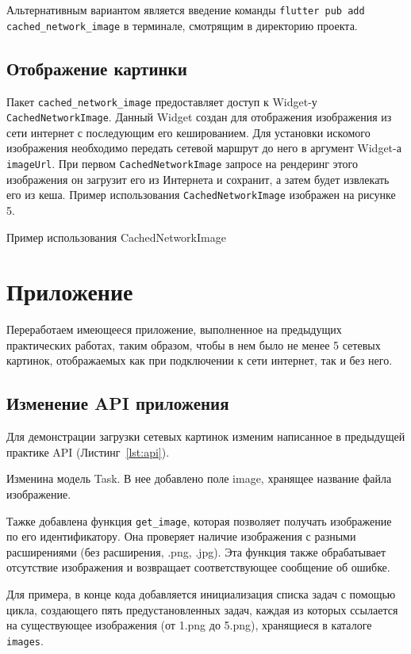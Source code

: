 Альтернативным вариантом является введение команды
\texttt{flutter pub add cached\_network\_image} в терминале,
смотрящим в директорию проекта.

\subsection{Отображение картинки}

Пакет \texttt{cached\_network\_image} предоставляет доступ
к Widget-у \texttt{CachedNetworkImage}.
Данный Widget создан для отображения изображения
из сети интернет с последующим его кешированием.
Для установки искомого изображения необходимо передать сетевой маршрут
до него в аргумент Widget-а \texttt{imageUrl}.
При первом \texttt{CachedNetworkImage} запросе на рендеринг этого изображения
он загрузит его из Интернета и сохранит,
а затем будет извлекать его из кеша.
Пример использования \texttt{CachedNetworkImage} изображен на рисунке 5.

\begin{image}
	\caption{Пример использования CachedNetworkImage}
	\label{fig:use:cni}
\end{image}

\section{Приложение}

Переработаем имеющееся приложение,
выполненное на предыдущих практических работах, таким образом,
чтобы в нем было не менее 5 сетевых картинок,
отображаемых как при подключении к сети интернет, так и без него.

\subsection{Изменение API приложения}

Для демонстрации загрузки сетевых картинок
изменим написанное в предыдущей практике API (Листинг~\ref{lst:api}).\par
Изменина модель Task. В нее добавлено поле image,
хранящее название файла изображение.\par
Тажке добавлена функция \texttt{get\_image},
которая позволяет получать изображение по его идентификатору.
Она проверяет наличие изображения с разными расширениями
(без расширения, .png, .jpg).
Эта функция также обрабатывает отсутствие изображения
и возвращает соответствующее сообщение об ошибке.\par
Для примера, в конце кода добавляется инициализация списка задач
с помощью цикла, создающего пять предустановленных задач,
каждая из которых ссылается на существующее изображения (от 1.png до 5.png),
хранящиеся в каталоге \texttt{images}.

